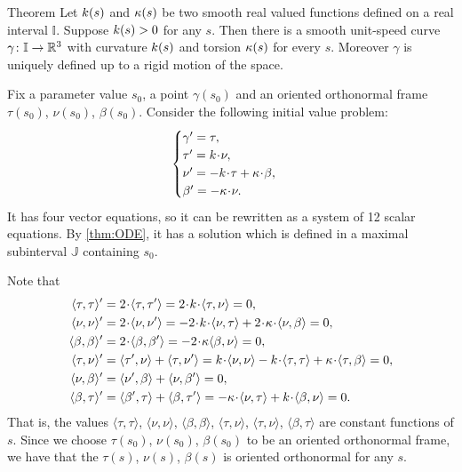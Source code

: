 \begin{thm}{Theorem}\label{thm:fund-curves}
Let $k(s)$ and $\kappa(s)$ be two smooth real valued functions defined on a real interval $\mathbb{I}$.
Suppose $k(s)>0$ for any $s$.
Then there is a smooth unit-speed curve $\gamma\colon\mathbb{I}\to\mathbb{R}^3$ with curvature $k(s)$ and torsion $\kappa(s)$ for every $s$.
Moreover $\gamma$ is uniquely defined up to a rigid motion of the space.
\end{thm}

Fix a parameter value $s_0$, a point $\gamma(s_0)$ and an oriented orthonormal frame $\tau(s_0)$, $\nu(s_0)$, $\beta(s_0)$.
Consider the following initial value problem: 
\[
\begin{cases}
\gamma'=\tau,
\\
\tau'=\kur\cdot\nu,
\\
\nu'=-\kur\cdot\tau+\tor\cdot\beta,
\\
\beta'=-\tor\cdot\nu.
\end{cases}
\]
It has four vector equations, so it can be rewritten as a system of 12 scalar equations.
By \ref{thm:ODE}, it has a solution which is defined in a maximal subinterval $\mathbb{J}$ containing $s_0$.

Note that 
\begin{align*}
\langle\tau,\tau\rangle'
&=
2\cdot\langle\tau,\tau'\rangle
=
2\cdot\kur\cdot \langle\tau,\nu\rangle
=
0,
\\
\langle\nu,\nu\rangle'
&=
2\cdot\langle\nu,\nu'\rangle
=
-
2\cdot\kur\cdot\langle\nu,\tau\rangle
+
2\cdot\tor\cdot\langle\nu,\beta\rangle
=
0,
\\
\langle\beta,\beta\rangle'
&=
2\cdot\langle\beta,\beta'\rangle
=
-2\cdot\tor\langle\beta,\nu\rangle
=
0,
\\
\langle\tau,\nu\rangle'
&=
\langle\tau',\nu\rangle
+
\langle\tau,\nu'\rangle
=
\kur\cdot\langle\nu,\nu\rangle
-
\kur\cdot\langle\tau,\tau\rangle
+
\tor\cdot\langle\tau,\beta\rangle
=
0,
\\
\langle\nu,\beta\rangle'
&=
\langle\nu',\beta\rangle+\langle\nu,\beta'\rangle
=0,
\\
\langle\beta,\tau\rangle'
&=
\langle\beta',\tau\rangle+\langle\beta,\tau'\rangle
=
-\tor\cdot \langle\nu,\tau\rangle
+\kur\cdot\langle\beta,\nu\rangle
=0.
\end{align*}
That is, the values 
$\langle\tau,\tau\rangle$,
$\langle\nu,\nu\rangle$,
$\langle\beta,\beta\rangle$,
$\langle\tau,\nu\rangle$,
$\langle\tau,\nu\rangle$,
$\langle\beta,\tau\rangle$
are constant functions of $s$.
Since we choose $\tau(s_0)$, $\nu(s_0)$, $\beta(s_0)$ to be an oriented orthonormal frame, we have that the $\tau(s)$, $\nu(s)$, $\beta(s)$ is oriented orthonormal for any $s$.

